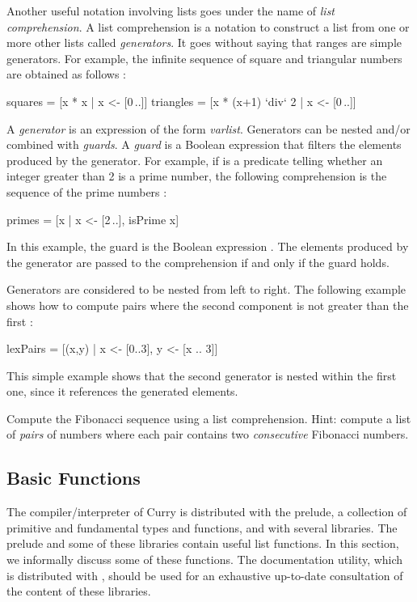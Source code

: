 Another useful notation involving lists goes under the name of
\emph{list comprehension}.
A list comprehension is a notation to construct a list from
one or more other lists called
\emph{generators}.
It goes without saying that ranges are simple generators.
For example, the infinite sequence of square and triangular
numbers are obtained as follows
:
%
\begin{prog}
squares   = [x * x | x <- [0\,..]]
triangles = [x * (x+1) `div` 2 | x <- [0\,..]]
\end{prog}
%
A \emph{generator}
is an expression of the form
\emph{var}\code{\,<-\,}\emph{list}.
Generators can be nested and/or combined with \emph{guards}.
A \emph{guard}
is a Boolean expression that filters the elements
produced by the generator.
For example, if  is a predicate telling whether
an integer greater than 2 is a prime number, the following
comprehension is the sequence of the prime numbers
:
%
\begin{prog}
primes = [x | x <- [2\,..], isPrime x] 
\end{prog}
%
In this example, the guard is the Boolean expression
. The elements produced by the generator
are passed to the comprehension if and only if the guard holds.

Generators are considered to be nested from left to right.
The following example shows how to compute pairs where
the second component is not greater than the first
:
%
\begin{prog}
lexPairs = [(x,y) | x <- [0..3], y <- [x .. 3]]
\end{prog}
%
This simple example shows that the second generator
 is nested within
the first one, since it references the generated elements.
%
\begin{exercise}
Compute the Fibonacci sequence using a list comprehension.
Hint: compute a list of \emph{pairs} of numbers where
each pair contains two \emph{consecutive} Fibonacci numbers.
\end{exercise}

\subsection{Basic Functions}
\label{basic-list-function}

The \pakcs{} compiler/interpreter of Curry is distributed
with the prelude, a collection of primitive and
fundamental types and functions, and with several libraries.
The prelude and some of these libraries contain
useful list functions.
In this section, we informally discuss some of these functions.
The 
documentation utility, which is
distributed with \pakcs, should be used for an exhaustive
up-to-date consultation of the content of these libraries.

